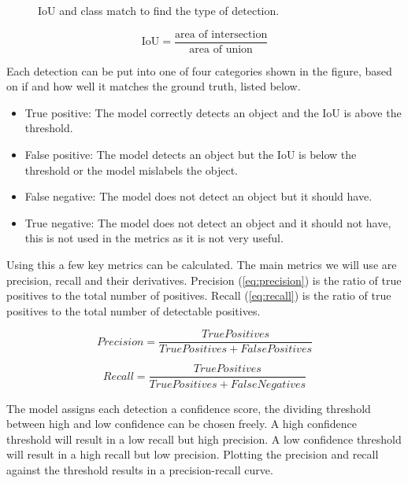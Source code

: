 \begin{figure}[h]
	\centering
	
	\caption{\label{fig:2_IoU_det} IoU and class match to find the type of detection.}
\end{figure}

\begin{equation}
	\text{IoU} = \frac{\text{area of intersection}}{\text{area of union}}
	\label{eq:IoU}
\end{equation}

Each detection can be put into one of four categories shown in the figure, based on if and how well it matches the ground truth, listed below.

\begin{itemize}
	\item True positive: The model correctly detects an object and the IoU is above the threshold.
	\item False positive: The model detects an object but the IoU is below the threshold or the model mislabels the object.
	\item False negative: The model does not detect an object but it should have.
	\item True negative: The model does not detect an object and it should not have, this is not used in the metrics as it is not very useful.
\end{itemize}

Using this a few key metrics can be calculated. The main metrics we will use are precision, recall and their derivatives. Precision (\ref{eq:precision}) is the ratio of true positives to the total number of positives. Recall (\ref{eq:recall}) is the ratio of true positives to the total number of detectable positives.



\begin{equation}
	Precision = \frac{TruePositives}{True Positives + False Positives}
	\label{eq:precision}
\end{equation}

\begin{equation}
	Recall = \frac{True Positives}{True Positives + False Negatives}
	\label{eq:recall}
\end{equation}

The model assigns each detection a confidence score, the dividing threshold between high and low confidence can be chosen freely. A high confidence threshold will result in a low recall but high precision. A low confidence threshold will result in a high recall but low precision. Plotting the precision and recall against the threshold results in a precision-recall curve.


